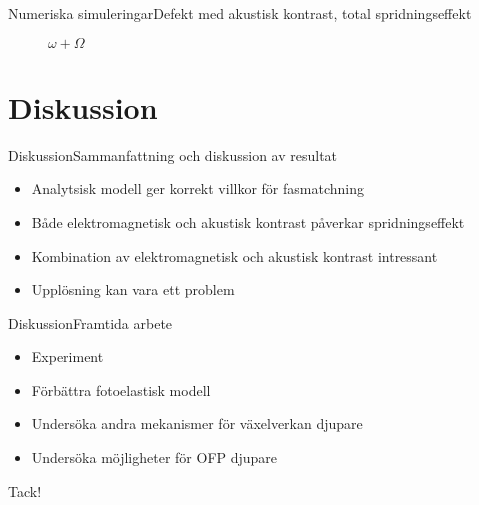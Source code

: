 \documentclass[11pt, final]{beamer}
\begin{document}
	\begin{frame}{Numeriska simuleringar}{Defekt med akustisk kontrast, total spridningseffekt}
		\begin{figure}
			\centering
			\resizebox{!}{0.8\textheight}{}
			\caption*{$\omega + \Omega$}
		\end{figure}
	\end{frame}
	
	\section{Diskussion}
	
	\begin{frame}{Diskussion}{Sammanfattning och diskussion av resultat}
		\begin{itemize}
			\item Analytsisk modell ger korrekt villkor för fasmatchning
			\pause
			\item Både elektromagnetisk och akustisk kontrast påverkar spridningseffekt
			\pause
			\item Kombination av elektromagnetisk och akustisk kontrast intressant
			\pause
			\item Upplösning kan vara ett problem
		\end{itemize}
	\end{frame}
	
	\begin{frame}{Diskussion}{Framtida arbete}
		\begin{itemize}
			\item Experiment
			\pause
			\item Förbättra fotoelastisk modell
			\pause
			\item Undersöka andra mekanismer för växelverkan djupare
			\pause
			\item Undersöka möjligheter för OFP djupare
		\end{itemize}
	\end{frame}
	
	\begin{frame}
		\centering \huge
		Tack!
	\end{frame}
\end{document}
